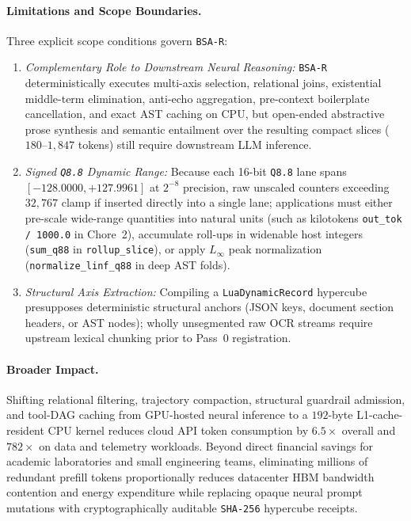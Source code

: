 \documentclass[11pt]{article}
\theoremstyle{plain}
\theoremstyle{definition}
\begin{document}
\paragraph{Limitations and Scope Boundaries.} Three explicit scope conditions govern \texttt{BSA-R}:
\begin{enumerate}
  \item \emph{Complementary Role to Downstream Neural Reasoning:} \texttt{BSA-R} deterministically executes multi-axis selection, relational joins, existential middle-term elimination, anti-echo aggregation, pre-context boilerplate cancellation, and exact AST caching on CPU, but open-ended abstractive prose synthesis and semantic entailment over the resulting compact slices ($180$--$1{,}847$ tokens) still require downstream LLM inference.
  \item \emph{Signed \texttt{Q8.8} Dynamic Range:} Because each 16-bit \texttt{Q8.8} lane spans $[-128.0000, +127.9961]$ at $2^{-8}$ precision, raw unscaled counters exceeding $32{,}767$ clamp if inserted directly into a single lane; applications must either pre-scale wide-range quantities into natural units (such as kilotokens \texttt{out\_tok / 1000.0} in Chore~2), accumulate roll-ups in widenable host integers (\texttt{sum\_q88} in \texttt{rollup\_slice}), or apply $L_\infty$ peak normalization (\texttt{normalize\_linf\_q88} in deep AST folds).
  \item \emph{Structural Axis Extraction:} Compiling a \texttt{LuaDynamicRecord} hypercube presupposes deterministic structural anchors (JSON keys, document section headers, or AST nodes); wholly unsegmented raw OCR streams require upstream lexical chunking prior to Pass~0 registration.
\end{enumerate}

\paragraph{Broader Impact.} Shifting relational filtering, trajectory compaction, structural guardrail admission, and tool-DAG caching from GPU-hosted neural inference to a $192$-byte L1-cache-resident CPU kernel reduces cloud API token consumption by $6.5\times$ overall and $782\times$ on data and telemetry workloads. Beyond direct financial savings for academic laboratories and small engineering teams, eliminating millions of redundant prefill tokens proportionally reduces datacenter HBM bandwidth contention and energy expenditure while replacing opaque neural prompt mutations with cryptographically auditable \texttt{SHA-256} hypercube receipts.
\end{document}
